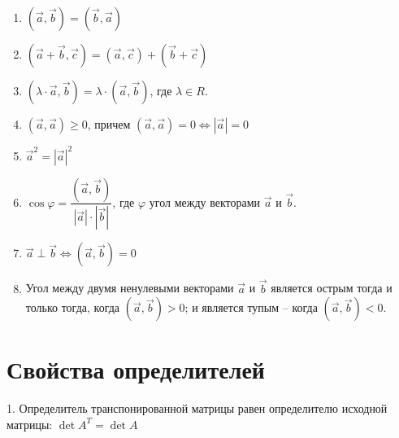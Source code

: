 \documentclass[12pt, fleqn]{extarticle}
\begin{document}
\begin{enumerate}
    \item \((\overrightarrow{a}, \overrightarrow{b}) = (\overrightarrow{b}, \overrightarrow{a})\)

    \item \((\overrightarrow{a} + \overrightarrow{b}, \overrightarrow{c}) = (\overrightarrow{a}, \overrightarrow{c}) + (\overrightarrow{b} + \overrightarrow{c})\)

    \item \((\lambda \cdot \overrightarrow{a}, \overrightarrow{b}) = \lambda \cdot (\overrightarrow{a}, \overrightarrow{b})\), где \(\lambda \in R\).

    \item \((\overrightarrow{a}, \overrightarrow{a}) \geq 0\), причем \((\overrightarrow{a}, \overrightarrow{a}) = 0 \iff |\overrightarrow{a}| = 0\)

    \item \(\overrightarrow{a}^2 = |\overrightarrow{a}|^2\)

    \item \(\cos{\varphi} = \dfrac{(\overrightarrow{a}, \overrightarrow{b})}{|\overrightarrow{a}| \cdot |\overrightarrow{b}|}\), где \(\varphi\) угол между векторами \(\overrightarrow{a}\) и \(\overrightarrow{b}\).

    \item \(\overrightarrow{a} \perp \overrightarrow{b} \iff (\overrightarrow{a}, \overrightarrow{b}) = 0\)

    \item Угол между двумя ненулевыми векторами \(\overrightarrow{a}\) и \(\overrightarrow{b}\) является острым тогда и только тогда, когда \((\overrightarrow{a}, \overrightarrow{b}) > 0\); и является тупым – когда \((\overrightarrow{a}, \overrightarrow{b}) < 0\).
\end{enumerate}


\newpage

\section{Свойства определителей}\label{sec:det}

1. Определитель транспонированной матрицы равен определителю исходной матрицы: \(\det A^T = \det A\)
\end{document}
